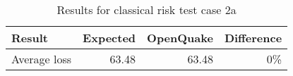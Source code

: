 \begin{table}[htbp]

\centering
\begin{tabular}{ l r r r }

\hline
\rowcolor{anti-flashwhite}
\bf{Result} & \bf{Expected} & \bf{OpenQuake} & \bf{Difference}\\
\hline
Average loss & 63.48 & 63.48 & 0\% \\
\hline
\end{tabular}

\caption{Results for classical risk test case 2a}
\label{tab:result-cr-2a}
\end{table}